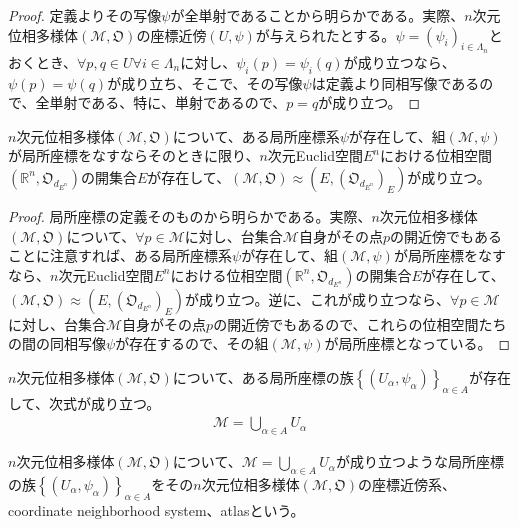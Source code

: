 \documentclass[dvipdfmx]{jsarticle}
\begin{document}
\begin{proof}
定義よりその写像$\psi$が全単射であることから明らかである。実際、$n$次元位相多様体$\left( \mathcal{M},\mathfrak{O} \right)$の座標近傍$(U,\psi)$が与えられたとする。$\psi = \left( \psi_{i} \right)_{i \in \varLambda_{n}}$とおくとき、$\forall p,q \in U\forall i \in \varLambda_{n}$に対し、$\psi_{i}(p) = \psi_{i}(q)$が成り立つなら、$\psi(p) = \psi(q)$が成り立ち、そこで、その写像$\psi$は定義より同相写像であるので、全単射である、特に、単射であるので、$p = q$が成り立つ。
\end{proof}
\begin{thm}\label{8.3.1.2}
$n$次元位相多様体$\left( \mathcal{M},\mathfrak{O} \right)$について、ある局所座標系$\psi$が存在して、組$\left( \mathcal{M},\psi \right)$が局所座標をなすならそのときに限り、$n$次元Euclid空間$E^{n}$における位相空間$\left( \mathbb{R}^{n},\mathfrak{O}_{d_{E^{n}}} \right)$の開集合$E$が存在して、$\left( \mathcal{M},\mathfrak{O} \right) \approx \left( E,\left( \mathfrak{O}_{d_{E^{n}}} \right)_{E} \right)$が成り立つ。
\end{thm}
\begin{proof}
局所座標の定義そのものから明らかである。実際、$n$次元位相多様体$\left( \mathcal{M},\mathfrak{O} \right)$について、$\forall p\in \mathcal{M}$に対し、台集合$\mathcal{M}$自身がその点$p$の開近傍でもあることに注意すれば、ある局所座標系$\psi$が存在して、組$\left( \mathcal{M},\psi \right)$が局所座標をなすなら、$n$次元Euclid空間$E^{n}$における位相空間$\left( \mathbb{R}^{n},\mathfrak{O}_{d_{E^{n}}} \right)$の開集合$E$が存在して、$\left( \mathcal{M},\mathfrak{O} \right) \approx \left( E,\left( \mathfrak{O}_{d_{E^{n}}} \right)_{E} \right)$が成り立つ。逆に、これが成り立つなら、$\forall p\in \mathcal{M}$に対し、台集合$\mathcal{M}$自身がその点$p$の開近傍でもあるので、これらの位相空間たちの間の同相写像$\psi$が存在するので、その組$\left( \mathcal{M},\psi \right)$が局所座標となっている。
\end{proof}
\begin{thm}\label{8.3.1.3}
$n$次元位相多様体$\left( \mathcal{M},\mathfrak{O} \right)$について、ある局所座標の族$\left\{ \left( U_{\alpha},\psi_{\alpha} \right) \right\}_{\alpha \in A}$が存在して、次式が成り立つ。
\begin{align*}
\mathcal{M} = \bigcup_{\alpha \in A} U_{\alpha}
\end{align*}
\end{thm}
\begin{dfn}
$n$次元位相多様体$\left( \mathcal{M},\mathfrak{O} \right)$について、$\mathcal{M} = \bigcup_{\alpha \in A} U_{\alpha}$が成り立つような局所座標の族$\left\{ \left( U_{\alpha},\psi_{\alpha} \right) \right\}_{\alpha \in A}$をその$n$次元位相多様体$\left( \mathcal{M},\mathfrak{O} \right)$の座標近傍系、coordinate
neighborhood system、atlasという。
\end{dfn}
\end{document}
